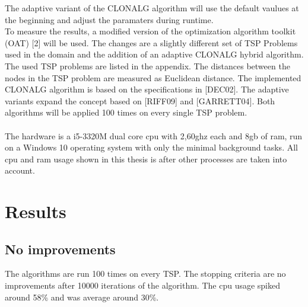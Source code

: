 The adaptive variant of the CLONALG algorithm will use the default vaulues at the beginning and adjust the paramaters during runtime.\\
To measure the results, a modified version of the optimization algorithm toolkit (OAT) [2] will be used. The changes are a slightly different set of TSP Problems used in the domain and the addition of an adaptive CLONALG hybrid algorithm. The used TSP problems are listed in the appendix. The distances between the nodes in the TSP problem are measured as Euclidean distance. The implemented CLONALG algorithm is based on the specifications in [DEC02]. The adaptive variants expand the concept based on [RIFF09] and [GARRETT04].
Both algorithms will be applied 100 times on every single TSP problem.\\\\
The hardware is a i5-3320M dual core cpu with 2,60ghz each and 8gb of ram, run on a Windows 10 operating system with only the minimal background tasks. All cpu and ram usage shown in this thesis is after other processes are taken into account.
\section{Results}
\subsection{No improvements}
The algorithms are run 100 times on every TSP. The stopping criteria are no improvements after 10000 iterations of the algorithm. The cpu usage spiked around 58\% and was average around 30\%. 